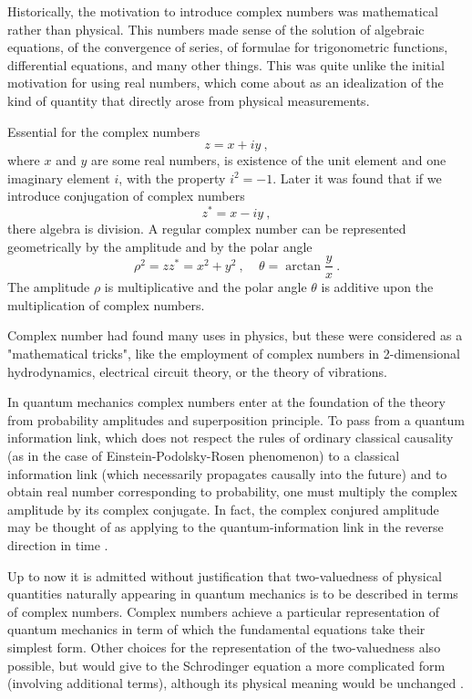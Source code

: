 \documentclass[a4paper,12pt]{article}
\begin{document}
Historically, the motivation to introduce complex numbers was mathematical rather than physical. 
This numbers made sense of the solution of algebraic equations, of the convergence of series, 
of formulae for trigonometric functions, differential equations, and many other things. This 
was quite unlike the initial motivation for using real numbers, which come about as an 
idealization of the kind of quantity that directly arose from physical measurements. 

Essential for the complex numbers 
\begin{equation} \label{z}
z= x + iy ~,
\end{equation}
where $x$ and $y$ are some real numbers, is existence of the unit element and one imaginary 
element $i$, with the property $i^2 = -1$. Later it was found that if we introduce conjugation 
of complex numbers 
\begin{equation} \label{z*}
z^* = x - iy ~,
\end{equation}
there algebra is division. A regular complex number can be represented geometrically by the 
amplitude and by the polar angle
\begin{equation} \label{Nz}
\rho^2 = zz^* = x^2 + y^2 ~, ~~~~~ \theta = \arctan{\frac{y}{x}} ~. 
\end{equation}
The amplitude $\rho $ is multiplicative and the polar angle $\theta$ is additive upon the 
multiplication of complex numbers. 

Complex number had found many uses in physics, but these were considered as a "mathematical 
tricks", like the employment of complex numbers in 2-dimensional hydrodynamics, electrical 
circuit theory, or the theory of vibrations. 

In quantum mechanics complex numbers enter at the foundation of the theory from probability 
amplitudes and superposition principle. To pass from a quantum information link, which does 
not respect the rules of ordinary classical causality (as in the case of Einstein-Podolsky-Rosen 
phenomenon) to a classical information link (which necessarily propagates causally into the 
future) and to obtain real number corresponding to probability, one must multiply the complex 
amplitude by its complex conjugate. In fact, the complex conjured amplitude may be thought of 
as applying to the quantum-information link in the reverse direction in time \cite{Pe}. 

Up to now it is admitted without justification that two-valuedness of physical quantities 
naturally appearing in quantum mechanics is to be described in terms of complex numbers. 
Complex numbers achieve a particular representation of quantum mechanics in term of which the 
fundamental equations take their simplest form. Other choices for the representation of the 
two-valuedness also possible, but would give to the Schrodinger equation a more complicated 
form (involving additional terms), although its physical meaning would be unchanged \cite{CeNo}. 
\end{document}
